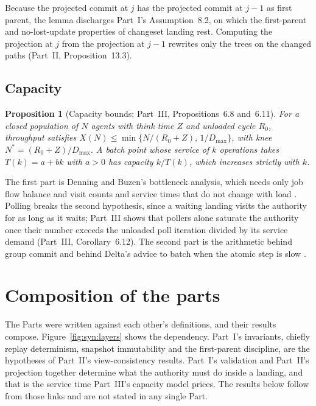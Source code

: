 \documentclass[11pt,letterpaper]{article}
\newtheorem{proposition}[theorem]{Proposition}
\theoremstyle{definition}
\theoremstyle{remark}
\begin{document}
Because the projected commit at $j$ has the projected commit at $j-1$ as first parent, the lemma discharges Part~I's Assumption~8.2, on which the first-parent and no-lost-update properties of changeset landing rest. Computing the projection at $j$ from the projection at $j-1$ rewrites only the trees on the changed paths (Part~II, Proposition~13.3).

\subsection{Capacity}

\begin{proposition}[Capacity bounds; Part~III, Propositions~6.8 and~6.11]
\label{prop:syn:capacity}
For a closed population of $N$ agents with think time $Z$ and unloaded cycle $R_0$, throughput satisfies $X(N)\le\min\{N/(R_0+Z),\,1/D_{\max}\}$, with knee $N^{*}=(R_0+Z)/D_{\max}$. A batch point whose service of $k$ operations takes $T(k)=a+bk$ with $a>0$ has capacity $k/T(k)$, which increases strictly with $k$.
\end{proposition}

The first part is Denning and Buzen's bottleneck analysis, which needs only job flow balance and visit counts and service times that do not change with load \cite{denning1978operational}. Polling breaks the second hypothesis, since a waiting landing visits the authority for as long as it waits; Part~III shows that pollers alone saturate the authority once their number exceeds the unloaded poll iteration divided by its service demand (Part~III, Corollary~6.12). The second part is the arithmetic behind group commit and behind Delta's advice to batch when the atomic step is slow \cite{dewitt1984main,armbrust2020delta}.

\section{Composition of the parts}
\label{sec:syn:composition}

The Parts were written against each other's definitions, and their results compose. Figure~\ref{fig:syn:layers} shows the dependency. Part~I's invariants, chiefly replay determinism, snapshot immutability and the first-parent discipline, are the hypotheses of Part~II's view-consistency results. Part~I's validation and Part~II's projection together determine what the authority must do inside a landing, and that is the service time Part~III's capacity model prices. The results below follow from those links and are not stated in any single Part.
\end{document}
